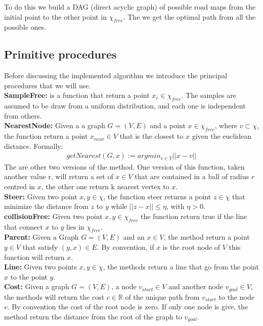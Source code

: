 \documentclass[10pt]{article}
\begin{document}
	To do this we build a DAG (direct acyclic graph) of possible road maps from the initial point to the other point in $\chi_{free}$. The we get the optimal path from all the possible ones.
	
	\subsection{Primitive procedures}
	Before discussing the implemented algorithm we introduce the principal procedures that we will use.\\
	
	\textbf{SampleFree:} is a function that return a point $x_{r} \in \chi_{free}$. The samples are assumed to be draw from a uniform distribution, and each one is independent from others.\\
	
	
	\textbf{NearestNode:} Given a a graph $G=(V,E)$ and a point $x\in\chi_{free}$, where $v\subset\chi$, the function return a point $x_{near} \in V$ that is the closest to $x$ given the euclidean distance. Formally: 
	\begin{align}
    getNearest (G,x) := argmin_{v \in V} ||x - v|| \nonumber
	\end{align}
	The are other two versions of the method. One version of this function, taken another value r, will return a set of $x\in V$ that are contained in a ball of radius $r$ centred in $x$, the other one return k nearest vertex to $x$.\\  
	
	\textbf{Steer:} Given two point $x,y \in \chi$, the function steer returns a point $z \in \chi$ that minimize the distance from $z$ to $y$ while $||z-x|| \le \eta$, with $\eta > 0$. \\
	
	\textbf{collisionFree:} Given two point $x,y \in \chi_{free}$ the function return true if the line that connect $x$ to $y$ lies in $\chi_{free}$.\\
	
	\textbf{Parent:} Given a Graph $G=(V,E)$ and an $x\in V$, the method return a point $y \in V$ that satisfy $(y,x) \in E$. By convention, if $x$ is the root node of $V$ this function will return $x$.\\
	
	\textbf{Line:} Given two points $x,y \in \chi$, the methods return a line that go from the point $x$ to the point $y$.\\
	
	\textbf{Cost:} Given a graph $G=(V,E)$, a node $v_{start} \in V$ and another node $v_{goal} \in V$, the methods will return the cost $c \in\mathbb{R}$ of the unique path from $v_{start}$ to the node $v$. By convention the cost of the root node is zero. If only one node is give, the method return the distance from the root of the graph to $v_{goal}$.\\
\end{document}
